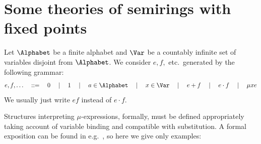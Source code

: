 \documentclass[runningheads]{amsart}
\begin{document}



\section{Some theories of semirings with fixed points}
\label{sec:prelims}

Let $\Alphabet$ be a finite alphabet and $\Var$ be a countably infinite set of variables disjoint from $\Alphabet$. 
We consider  $e,f,$ etc.\ generated by the following grammar:
\[
e,f,\dots \quad ::= \quad
0 \quad \mid \quad 1 \quad \mid \quad a \in \Alphabet \quad \mid \quad x\in\Var \quad \mid \quad e+f \quad \mid \quad e\cdot f \quad \mid \quad \mu x e
\]
We usually just write $ef$ instead of $e\cdot f$.

Structures interpreting $\mu$-expressions, formally, must be defined appropriately taking account of variable binding and compatible with substitution. 
A formal exposition can be found in e.g.\ \cite{EsikLeiss05,Leiss16}, so here we give only examples:
\end{document}
